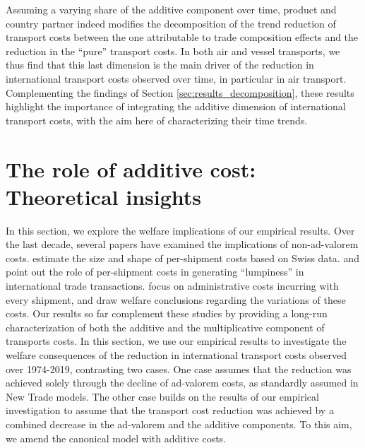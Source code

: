 \documentclass[a4paper,11pt]{article}
\begin{document}
Assuming a varying share of the additive component over time, product and country partner indeed modifies the decomposition of the trend reduction of transport costs between the one attributable to trade composition effects and the reduction in the ``pure'' transport costs.
In both air and vessel transports, we thus find that this last dimension is the main driver of the reduction in international transport costs observed over time, in particular in air transport.
Complementing the findings of Section \ref{sec:results_decomposition}, these results highlight the importance of integrating the additive dimension of international transport costs, with the aim here of characterizing their time trends.

\section{The role of additive cost: Theoretical insights}\label{sec:theory}


In this section, we explore the welfare implications of our empirical results. Over the last decade, several papers have examined the implications of non-ad-valorem costs. \cite{Kropf-Saure-JIE-2016} estimate the size and shape of per-shipment costs based on Swiss data. \cite{Alessandria-et-al-AER-2010} and \cite{Hornok-et-al-RES-2015} point out the role of per-shipment costs in generating ``lumpiness'' in international trade transactions. \cite{Hornok-et-al-JIE-2015} focus on administrative costs incurring with every shipment, and draw welfare conclusions regarding the variations of these costs. Our results so far complement these studies by providing a long-run characterization of both the additive and the multiplicative component of transports costs. In this section, we use our empirical results to investigate the welfare consequences of the reduction in international transport costs observed over 1974-2019, contrasting two cases. One case assumes that the reduction was achieved solely through the decline of ad-valorem costs, as standardly assumed in New Trade models. The other case builds on the results of our empirical investigation to assume that the transport cost reduction was achieved by a combined decrease in the ad-valorem and the additive components. To this aim, we amend the canonical \citet{melitz} model with additive costs.\smallskip
\end{document}
